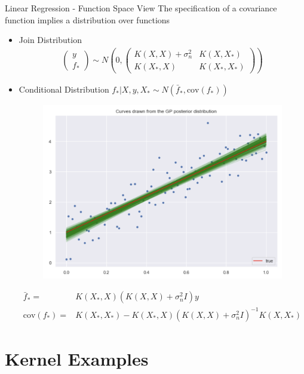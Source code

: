 \documentclass[10pt]{beamer}
\begin{document}
\begin{frame}{Linear Regression - Function Space View}
{The specification of a covariance function implies a distribution over functions}
\begin{itemize}
\item Join Distribution
\begin{align*}
\left(
\begin{array}{c}
y \\
f_*
\end{array}
\right)
\sim
N\left(0, 
\left(
\begin{array}{cc}
K(X,X)+\sigma_n^2 & K(X,X_*) \\
K(X_*,X) & K(X_*,X_*)
\end{array}
\right)
\right)
\end{align*}
\item Conditional Distribution $f_* | X, y, X_*\sim N(\bar{f}_*, \text{cov}(f_*))$
\begin{center}
\begin{figure}
\includegraphics[scale=0.15]{images/gp_lin_posterior.png} 
\end{figure}
\end{center}
\begin{align*}
\bar{f}_* =& K(X_*,X)(K(X,X) + \sigma_n^2 I)y \\
 \text{cov}(f_*) =& K(X_*,X_*) - K(X_*,X)(K(X,X) + \sigma_n^2I)^{-1}K(X,X_*)
\end{align*}
\end{itemize}
\end{frame}


\section{Kernel Examples}
\end{document}
